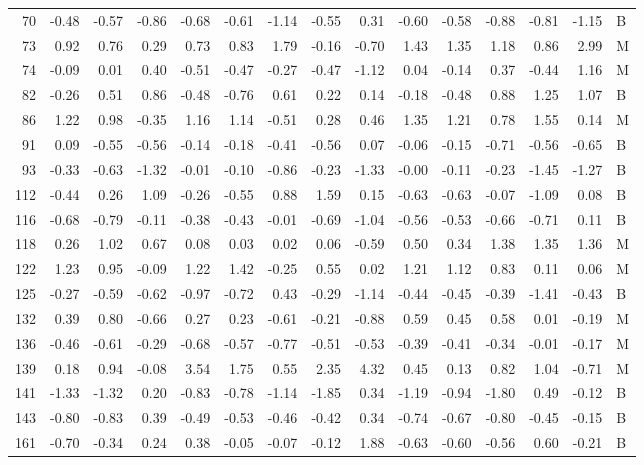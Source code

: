 \begin{table}[ht]
\begin{tabular}{rrrrrrrrrrrrrrl}
  70 & -0.48 & -0.57 & -0.86 & -0.68 & -0.61 & -1.14 & -0.55 & 0.31 & -0.60 & -0.58 & -0.88 & -0.81 & -1.15 & B \\ 
  73 & 0.92 & 0.76 & 0.29 & 0.73 & 0.83 & 1.79 & -0.16 & -0.70 & 1.43 & 1.35 & 1.18 & 0.86 & 2.99 & M \\ 
  74 & -0.09 & 0.01 & 0.40 & -0.51 & -0.47 & -0.27 & -0.47 & -1.12 & 0.04 & -0.14 & 0.37 & -0.44 & 1.16 & M \\ 
  82 & -0.26 & 0.51 & 0.86 & -0.48 & -0.76 & 0.61 & 0.22 & 0.14 & -0.18 & -0.48 & 0.88 & 1.25 & 1.07 & B \\ 
  86 & 1.22 & 0.98 & -0.35 & 1.16 & 1.14 & -0.51 & 0.28 & 0.46 & 1.35 & 1.21 & 0.78 & 1.55 & 0.14 & M \\ 
  91 & 0.09 & -0.55 & -0.56 & -0.14 & -0.18 & -0.41 & -0.56 & 0.07 & -0.06 & -0.15 & -0.71 & -0.56 & -0.65 & B \\ 
  93 & -0.33 & -0.63 & -1.32 & -0.01 & -0.10 & -0.86 & -0.23 & -1.33 & -0.00 & -0.11 & -0.23 & -1.45 & -1.27 & B \\ 
  112 & -0.44 & 0.26 & 1.09 & -0.26 & -0.55 & 0.88 & 1.59 & 0.15 & -0.63 & -0.63 & -0.07 & -1.09 & 0.08 & B \\ 
  116 & -0.68 & -0.79 & -0.11 & -0.38 & -0.43 & -0.01 & -0.69 & -1.04 & -0.56 & -0.53 & -0.66 & -0.71 & 0.11 & B \\ 
  118 & 0.26 & 1.02 & 0.67 & 0.08 & 0.03 & 0.02 & 0.06 & -0.59 & 0.50 & 0.34 & 1.38 & 1.35 & 1.36 & M \\ 
  122 & 1.23 & 0.95 & -0.09 & 1.22 & 1.42 & -0.25 & 0.55 & 0.02 & 1.21 & 1.12 & 0.83 & 0.11 & 0.06 & M \\ 
  125 & -0.27 & -0.59 & -0.62 & -0.97 & -0.72 & 0.43 & -0.29 & -1.14 & -0.44 & -0.45 & -0.39 & -1.41 & -0.43 & B \\ 
  132 & 0.39 & 0.80 & -0.66 & 0.27 & 0.23 & -0.61 & -0.21 & -0.88 & 0.59 & 0.45 & 0.58 & 0.01 & -0.19 & M \\ 
  136 & -0.46 & -0.61 & -0.29 & -0.68 & -0.57 & -0.77 & -0.51 & -0.53 & -0.39 & -0.41 & -0.34 & -0.01 & -0.17 & M \\ 
  139 & 0.18 & 0.94 & -0.08 & 3.54 & 1.75 & 0.55 & 2.35 & 4.32 & 0.45 & 0.13 & 0.82 & 1.04 & -0.71 & M \\ 
  141 & -1.33 & -1.32 & 0.20 & -0.83 & -0.78 & -1.14 & -1.85 & 0.34 & -1.19 & -0.94 & -1.80 & 0.49 & -0.12 & B \\ 
  143 & -0.80 & -0.83 & 0.39 & -0.49 & -0.53 & -0.46 & -0.42 & 0.34 & -0.74 & -0.67 & -0.80 & -0.45 & -0.15 & B \\ 
  161 & -0.70 & -0.34 & 0.24 & 0.38 & -0.05 & -0.07 & -0.12 & 1.88 & -0.63 & -0.60 & -0.56 & 0.60 & -0.21 & B \\ 

\end{tabular}
\end{table}
